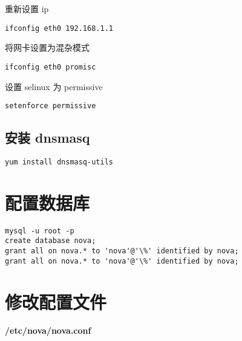 \documentclass[letterpaper,10pt,english]{sphinxmanual}
\begin{document}
重新设置 ip

\begin{Verbatim}[commandchars=\\\{\}]
ifconfig eth0 192.168.1.1
\end{Verbatim}

将网卡设置为混杂模式

\begin{Verbatim}[commandchars=\\\{\}]
ifconfig eth0 promisc
\end{Verbatim}

设置 selinux 为 permissive

\begin{Verbatim}[commandchars=\\\{\}]
setenforce permissive
\end{Verbatim}


\subsection{安装 dnsmasq}
\label{nova:dnsmasq}
\begin{Verbatim}[commandchars=\\\{\}]
yum install dnsmasq-utils
\end{Verbatim}


\section{配置数据库}
\label{nova:id3}
\begin{Verbatim}[commandchars=\\\{\}]
mysql -u root -p
create database nova;
grant all on nova.* to 'nova'@'\%' identified by nova;
grant all on nova.* to 'nova'@'\%' identified by nova;
\end{Verbatim}


\section{修改配置文件}
\label{nova:id4}
\textbf{/etc/nova/nova.conf}
\end{document}
